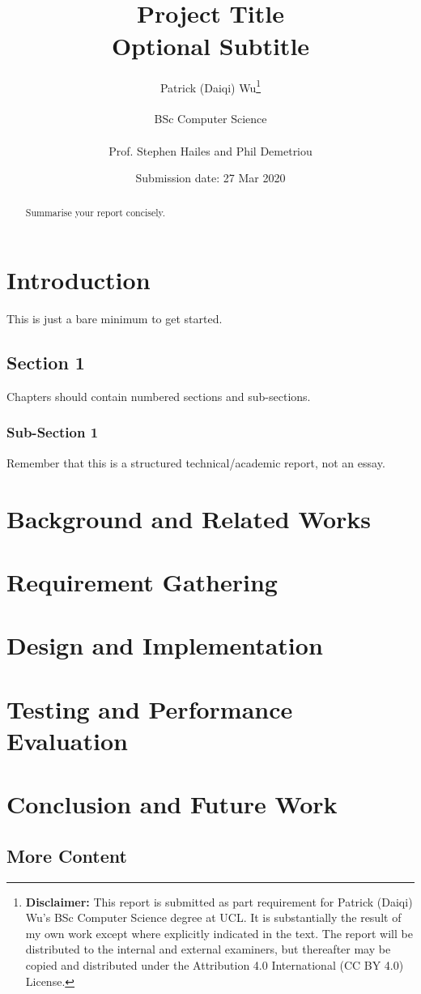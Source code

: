 \documentclass[a4paper]{report}
\title{{\vspace{-14em}}\\
{{\Huge Project Title}}\\
{\large Optional Subtitle}\\}
\date{Submission date: 27 Mar 2020}
\author{Patrick (Daiqi) Wu\thanks{
{\bf Disclaimer:}
This report is submitted as part requirement for Patrick (Daiqi) Wu's BSc Computer Science degree at UCL. It is
substantially the result of my own work except where explicitly indicated in the text.
The report will be distributed to the internal and external examiners, but thereafter may be copied and distributed under the Attribution 4.0 International (CC BY 4.0) License.}
\\ \\
BSc Computer Science\\ \\
Prof. Stephen Hailes and Phil Demetriou}
\begin{document}
 
\onehalfspacing
\maketitle
\begin{abstract}
Summarise your report concisely.
\end{abstract}
\tableofcontents
\setcounter{page}{1}


\chapter{Introduction}
This is just a bare minimum to get started.

\section{Section 1}
Chapters should contain numbered sections and sub-sections.

\subsection{Sub-Section 1}
Remember that this is a structured technical/academic report, not an essay.

\chapter{Background and Related Works}

\chapter{Requirement Gathering}

\chapter{Design and Implementation}

\chapter{Testing and Performance Evaluation}

\chapter{Conclusion and Future Work}

\section{More Content}
\end{document}
